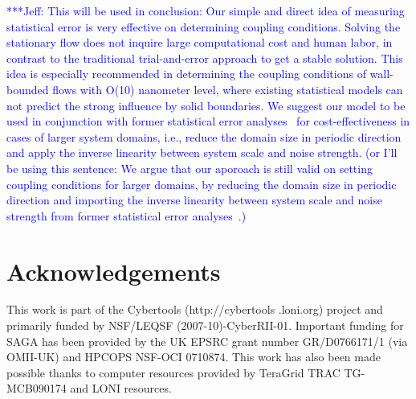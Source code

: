 \documentclass[preprint,12pt]{elsarticle}
\newcommand{\skonote}[1]{ {\textcolor{blue} { ***Jeff: #1 }}}
\newcommand{\skonote}[1]{}
\begin{document}
\skonote{This will be used in conclusion: Our simple and direct idea of measuring statistical error is very effective on determining coupling conditions. Solving the stationary flow does not inquire large computational cost and human labor, in contrast to the traditional trial-and-error approach to get a stable solution. This idea is especially recommended in determining the coupling conditions of wall-bounded flows with O(10) nanometer level, where existing statistical models can not predict the strong influence by solid boundaries. We suggest our model to be used in conjunction with former statistical error analyses~\cite{Hadjicon3,Time_Mechanism} for cost-effectiveness in cases of larger system domains, i.e., reduce the domain size in periodic direction and apply the inverse linearity between system scale and noise strength. (or I'll be using this sentence: We argue that our aporoach is still valid on setting coupling conditions for larger domains, by reducing the domain size in periodic direction and importing the inverse linearity between system scale and noise strength from former statistical error analyses~\cite{Hadjicon3,Time_Mechanism}.)
}




\section*{Acknowledgements}
This work is part of the Cybertools (http://cybertools .loni.org)
project and primarily funded by NSF/LEQSF (2007-10)-CyberRII-01.
Important funding for SAGA has been provided by the UK EPSRC grant
number GR/D0766171/1 (via OMII-UK) and HPCOPS NSF-OCI 0710874. This
work has also been made possible thanks to computer resources provided
by TeraGrid TRAC TG-MCB090174 and LONI resources.













\end{document}
